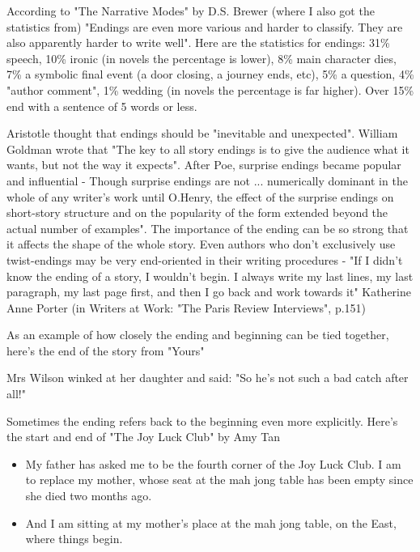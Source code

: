 \documentclass[11pt]{article}
\newenvironment{narrow}[2]{%
 \begin{list}{}{%
  \setlength{\topsep}{0pt}%
  \setlength{\leftmargin}{#1}%
  \setlength{\rightmargin}{#2}%
  \setlength{\listparindent}{\parindent}%
  \setlength{\itemindent}{\parindent}%
  \setlength{\parsep}{\parskip}%
 }%
\item[]}{\end{list}}
\begin{document}
According to "The Narrative Modes" by D.S. Brewer (where I also got the statistics from) "Endings are even more various and harder to classify. They are also apparently harder to write well". Here are the statistics for endings: 31\% speech, 10\% ironic (in novels the percentage is lower), 8\% main character dies, 7\% a symbolic final event (a door closing, a journey ends, etc), 5\% a question, 4\% "author comment", 1\% wedding (in novels the percentage is far higher). Over 15\% end with a sentence of 5 words or less.



Aristotle thought that endings should be "inevitable and unexpected". William Goldman wrote that "The key to all story endings is to give the audience what it wants, but not the way it expects".
After Poe, surprise endings became popular and influential - Though surprise endings are not ... numerically dominant in the whole of any writer's work until O.Henry, the effect of the surprise endings on short-story structure and on the popularity of the form extended beyond the actual number of examples". The importance of the ending can be so strong that it affects the shape of the whole story. Even authors who don't exclusively use twist-endings may be very end-oriented in their writing procedures - "If I didn't know the ending of a story, I wouldn't begin. I always write my last lines, my last paragraph, my last page first, and then I go back and work towards it" Katherine Anne Porter (in Writers at Work: "The Paris Review Interviews", p.151)




As an example of how closely the ending and beginning can be tied together, here's the end of the story from "Yours"

\begin{narrow}{1.0cm}{1.0cm}
Mrs Wilson winked at her daughter and said: "So he's not such a bad catch after all!"
\end{narrow}

Sometimes the ending refers back to the beginning even more explicitly. Here's the start and end of "The Joy Luck Club" by Amy Tan



\begin{itemize}
\item  My father has asked me to be the fourth corner of the Joy Luck Club. I am to replace my mother, whose seat at the mah jong table has been empty since she died two months ago.
\item And I am sitting at my mother's place at the mah jong table, on the East, where things begin.
\end{itemize}
\end{document}
